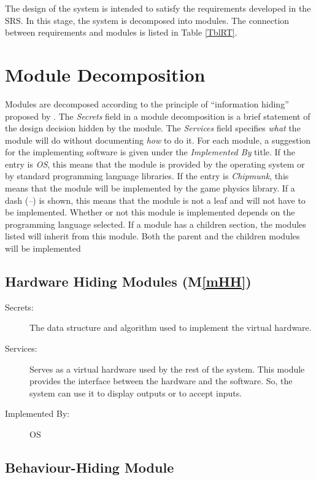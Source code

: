 \documentclass[12pt]{article}
\newcommand{\mref}[1]{M\ref{#1}}
\begin{document}
The design of the system is intended to satisfy the requirements developed in
the SRS. In this stage, the system is decomposed into modules. The connection
between requirements and modules is listed in Table \ref{TblRT}.

\section{Module Decomposition} \label{SecMD}

Modules are decomposed according to the principle of ``information hiding''
proposed by \citet{ParnasEtAl1984}. The \emph{Secrets} field in a module
decomposition is a brief statement of the design decision hidden by the
module. The \emph{Services} field specifies \emph{what} the module will do
without documenting \emph{how} to do it. For each module, a suggestion for the
implementing software is given under the \emph{Implemented By} title. If the
entry is \emph{OS}, this means that the module is provided by the operating
system or by standard programming language libraries. If the entry is
\emph{Chipmunk}, this means that the module will be implemented by the 
game physics library.  
If a dash (\emph{--}) is shown, this means
that the module is not a leaf and will not have to be implemented. Whether or
not this module is implemented depends on the programming language
selected.
If a module has a children section, the modules listed will inherit from  
this module. Both the parent and the children modules will be implemented

\subsection{Hardware Hiding Modules (\mref{mHH})}

\begin{description}
\item[Secrets:]The data structure and algorithm used to implement the virtual
  hardware.
\item[Services:]Serves as a virtual hardware used by the rest of the
  system. This module provides the interface between the hardware and the
  software. So, the system can use it to display outputs or to accept inputs.
\item[Implemented By:] OS
\end{description}

\subsection{Behaviour-Hiding Module}
\end{document}
